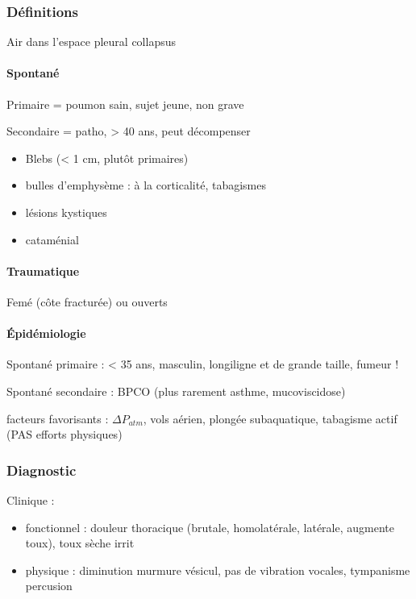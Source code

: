 \documentclass[11pt]{article}
\begin{document}
\subsubsection{Définitions}
\label{sec:org8d9d7d8}
Air dans l'espace pleural \thus collapsus 

\paragraph{Spontané}
\label{sec:org0b52668}
Primaire = poumon sain, sujet jeune, non grave

Secondaire = patho, > 40 ans, peut décompenser


\begin{itemize}
\item Blebs (< 1 cm, plutôt primaires)
\item bulles d'emphysème : à la corticalité, tabagismes
\item lésions kystiques
\item cataménial
\end{itemize}


\paragraph{Traumatique}
\label{sec:orge171399}
Femé (côte fracturée) ou ouverts

\paragraph{Épidémiologie}
\label{sec:orgc254ea2}
Spontané primaire : < 35 ans, masculin, longiligne et de grande taille, fumeur !

Spontané secondaire : BPCO (plus rarement asthme, mucoviscidose)

facteurs favorisants : \(\Delta P_{atm}\), vols aérien, plongée subaquatique,
tabagisme actif (PAS
efforts physiques)

\subsubsection{Diagnostic}
\label{sec:org295d13a}
Clinique : 

\begin{itemize}
\item fonctionnel : douleur thoracique (brutale, homolatérale, latérale,
augmente toux), toux sèche irrit
\item physique : diminution murmure vésicul, pas de vibration vocales,
tympanisme percusion
\end{itemize}
\end{document}
